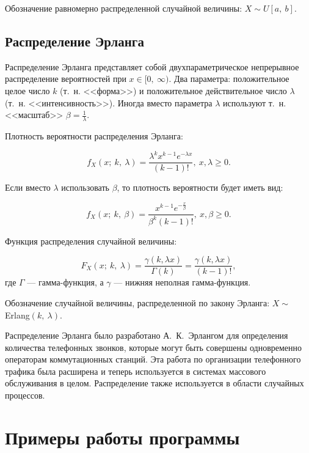 \documentclass{bmstu}
\begin{document}
Обозначение равномерно распределенной случайной величины: \mbox{$X \sim U[a,~b]$}.

\section{Распределение Эрланга}

Распределение Эрланга представляет собой двухпараметрическое непрерывное распределение вероятностей при $x \in [0,~\infty)$. 
Два параметра: положительное целое число $k$ (т.~н. <<форма>>) и положительное действительное число $\lambda$ (т.~н. <<интенсивность>>). 
Иногда вместо параметра $\lambda$ используют т.~н. <<масштаб>> $\beta = \frac{1}{\lambda}$.

Плотность вероятности распределения Эрланга:

\begin{equation}
f_{X}(x;~k,~\lambda) = \frac{\lambda^{k} x^{k - 1} e^{-\lambda x}}{(k-1)!},~x,\lambda \geq 0.
\end{equation}

Если вместо $\lambda$ использовать $\beta$, то плотность вероятности будет иметь вид:

\begin{equation}
f_{X}(x;~k,~\beta) = \frac{x^{k - 1} e^{-\frac{x}{\beta}}}{\beta^{k} (k-1)!},~x,\beta \geq 0.
\end{equation}

Функция распределения случайной величины:

\begin{equation}
F_{X}(x;~k,~\lambda) = \frac{\gamma(k, \lambda x)}{\Gamma(k)} = \frac{\gamma(k, \lambda x)}{(k-1)!},
\end{equation}
где $\Gamma$ --- гамма-функция, а $\gamma$ --- нижняя неполная гамма-функция.

Обозначение случайной величины, распределенной по закону Эрланга: \mbox{$X \sim ${Erlang}$(k,~\lambda)$}.

Распределение Эрланга было разработано А.~К.~Эрлангом для определения количества телефонных звонков, которые могут быть совершены одновременно операторам коммутационных станций. 
Эта работа по организации телефонного трафика была расширена и теперь используется в системах массового обслуживания в целом. 
Распределение также используется в области случайных процессов.

\chapter{Примеры работы программы}
\end{document}
